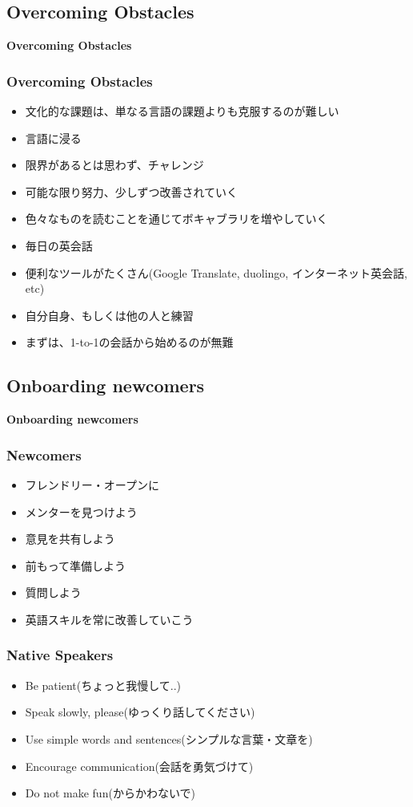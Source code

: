 \documentclass[aspectratio=169,11pt,hyperref={colorlinks=true}]{beamer}
\begin{document}
\subsection{Overcoming Obstacles}
\begin{frame}
  \bf\Huge{Overcoming Obstacles}
\end{frame}

\begin{frame}
\frametitle{Overcoming Obstacles}
  \begin{itemize}
  \item 文化的な課題は、単なる言語の課題よりも克服するのが難しい
  \item 言語に浸る
  \item 限界があるとは思わず、チャレンジ
  \item 可能な限り努力、少しずつ改善されていく
  \item 色々なものを読むことを通じてボキャブラリを増やしていく
  \item 毎日の英会話
  \item 便利なツールがたくさん(Google Translate, duolingo, インターネット英会話, etc)
  \item 自分自身、もしくは他の人と練習
  \item まずは、1-to-1の会話から始めるのが無難
  \end{itemize}
\end{frame}


\subsection{Onboarding newcomers}
\begin{frame}
  \bf\Huge{Onboarding newcomers}
\end{frame}

\begin{frame}
\frametitle{Newcomers}
  \begin{itemize}
  \item フレンドリー・オープンに
  \item メンターを見つけよう
  \item 意見を共有しよう
  \item 前もって準備しよう
  \item 質問しよう
  \item 英語スキルを常に改善していこう
  \end{itemize}
\end{frame}

\begin{frame}
\frametitle{Native Speakers}
  \begin{itemize}
  \item Be patient(ちょっと我慢して..)
  \item Speak slowly, please(ゆっくり話してください)
  \item Use simple words and sentences(シンプルな言葉・文章を)
  \item Encourage communication(会話を勇気づけて)
  \item Do not make fun(からかわないで)
  \end{itemize}
\end{frame}
\end{document}
